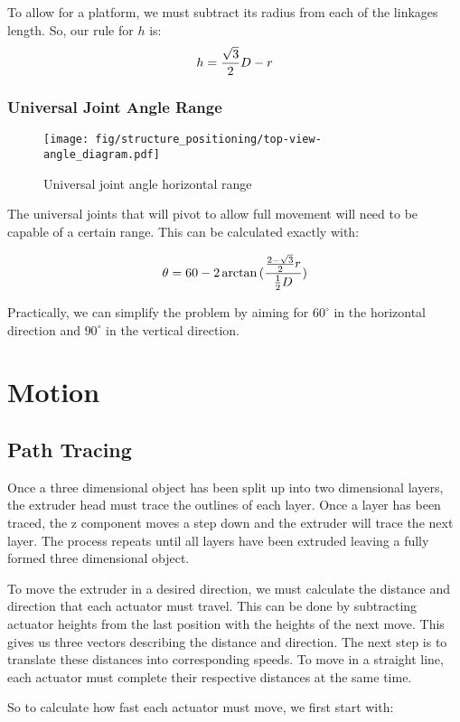\documentclass[a4paper, 11pt, twoside]{Thesis}  %
\begin{document}
To allow for a platform, we must subtract its radius from each of the linkages length. So, our rule for $h$ is:
$$h = {\sqrt{3}\over 2}D - r $$

\subsection{Universal Joint Angle Range}


\begin{figure}[H]
\centering%
\texttt{[image: fig/structure\_positioning/top-view-angle\_diagram.pdf]}
\caption{Universal joint angle horizontal range}
\label{fig:top-view-angle_diagram.svg}
\end{figure}
The universal joints that will pivot to allow full movement will need to be capable of a certain range. This can be calculated exactly with:

$$ \theta = 60 - 2 \arctan{({  { {2 - \sqrt 3 }\over 2} r  \over  {1\over 2} D   } )} $$

Practically, we can simplify the problem by aiming for $60^{\circ}$ in the horizontal direction and $90^{\circ}$ in the vertical direction.
\chapter{Motion}
\label{Motion}

\section{Path Tracing}

Once a three dimensional object has been split up into two dimensional layers, the extruder head must trace the outlines of each layer. Once a layer has been traced, the z component moves a step down and the extruder will trace the next layer. The process repeats until all layers have been extruded leaving a fully formed three dimensional object.

To move the extruder in a desired direction, we must calculate the distance and direction that each actuator must travel. This can be done by subtracting actuator heights from the last position with the heights of the next move. This gives us three vectors describing the distance and direction. The next step is to translate these distances into corresponding speeds. To move in a straight line, each actuator must complete their respective distances at the same time. 

So to calculate how fast each actuator must move, we first start with:
\end{document}
